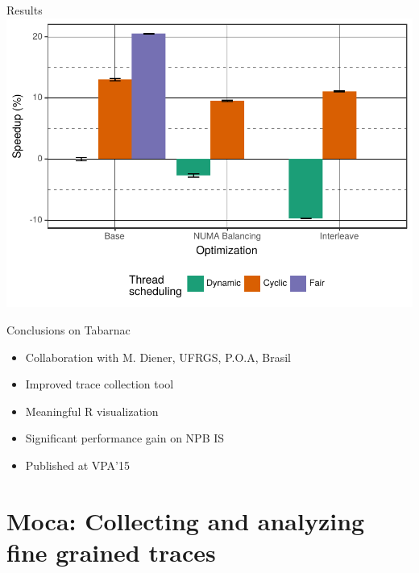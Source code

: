 \documentclass[xcolor={usenames,dvipsnames},hyperref={pdfusetitle}]{beamer}
\begin{document}
\begin{frame}{Results}
    \includegraphics[width=\linewidth]{tabarnac/slides/is_exectime}
\end{frame}

\begin{frame}{Conclusions on Tabarnac}
    \begin{itemize}
        \item Collaboration with M. Diener, UFRGS, P.O.A, Brasil
        \item Improved trace collection tool
        \item Meaningful R visualization
        \item Significant performance gain on NPB IS
        \item Published at VPA'15~\cite{Beniamine15TABARNAC}
    \end{itemize}
\end{frame}

\section{Moca: Collecting and analyzing fine grained traces}
\end{document}
